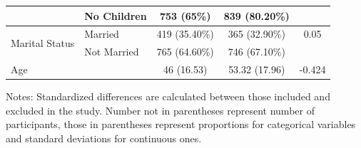 \documentclass[12pt]{article}
\begin{document}
\begin{table}[htbp]
\begin{threeparttable}
\begin{tabular}{llccc}
                          & No Children  & 753 (65\%) & 839 (80.20\%) & \\
\midrule
\multirow{2}{*}{Marital Status} & Married     & 419 (35.40\%) & 365 (32.90\%) & 0.05 \\
                                & Not Married &   765 (64.60\%)          &    746 (67.10\%)         & \\
\midrule
Age  & & 46 (16.53) & 53.32 (17.96) & -0.424 \\
\bottomrule
\end{tabular}
\begin{tablenotes}
\footnotesize
\item Notes: Standardized differences are calculated between those included and excluded in the study. Number not in parentheses represent number of participants, those in parentheses represent proportions for categorical variables and standard deviations for continuous ones.
\end{tablenotes}
\end{threeparttable}
\end{table}

\clearpage
\end{document}
